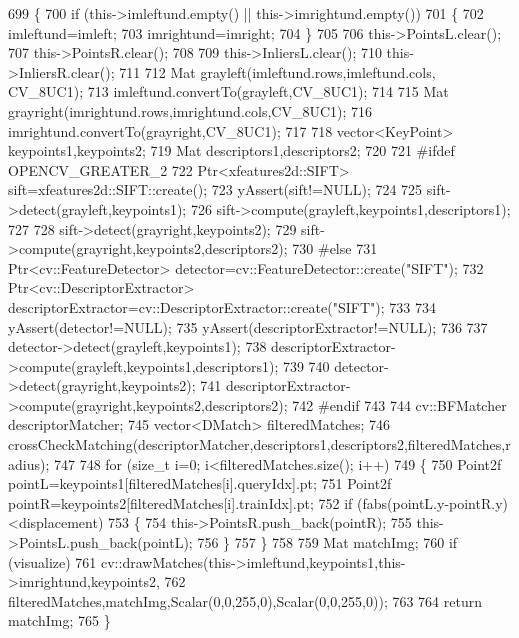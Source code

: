\begin{DoxyCode}
699 \{
700     \textcolor{keywordflow}{if} (this->imleftund.empty() || this->imrightund.empty())
701     \{
702         imleftund=imleft;
703         imrightund=imright;
704     \}
705 
706     this->PointsL.clear();
707     this->PointsR.clear();
708 
709     this->InliersL.clear();
710     this->InliersR.clear();
711 
712     Mat grayleft(imleftund.rows,imleftund.cols, CV\_8UC1);
713     imleftund.convertTo(grayleft,CV\_8UC1);
714 
715     Mat grayright(imrightund.rows,imrightund.cols,CV\_8UC1);
716     imrightund.convertTo(grayright,CV\_8UC1);
717 
718     vector<KeyPoint> keypoints1,keypoints2;
719     Mat descriptors1,descriptors2;
720 
721 \textcolor{preprocessor}{#ifdef OPENCV\_GREATER\_2}
722     Ptr<xfeatures2d::SIFT> sift=xfeatures2d::SIFT::create();
723     yAssert(sift!=NULL);
724 
725     sift->detect(grayleft,keypoints1);
726     sift->compute(grayleft,keypoints1,descriptors1);
727 
728     sift->detect(grayright,keypoints2);
729     sift->compute(grayright,keypoints2,descriptors2);
730 \textcolor{preprocessor}{#else}
731     Ptr<cv::FeatureDetector> detector=cv::FeatureDetector::create(\textcolor{stringliteral}{"SIFT"});
732     Ptr<cv::DescriptorExtractor> descriptorExtractor=cv::DescriptorExtractor::create(\textcolor{stringliteral}{"SIFT"});
733 
734     yAssert(detector!=NULL);
735     yAssert(descriptorExtractor!=NULL);
736 
737     detector->detect(grayleft,keypoints1);
738     descriptorExtractor->compute(grayleft,keypoints1,descriptors1);
739 
740     detector->detect(grayright,keypoints2);
741     descriptorExtractor->compute(grayright,keypoints2,descriptors2);
742 \textcolor{preprocessor}{#endif}
743     
744     cv::BFMatcher descriptorMatcher;
745     vector<DMatch> filteredMatches;
746     crossCheckMatching(descriptorMatcher,descriptors1,descriptors2,filteredMatches,radius);
747 
748     \textcolor{keywordflow}{for} (\textcolor{keywordtype}{size\_t} i=0; i<filteredMatches.size(); i++)
749     \{
750         Point2f pointL=keypoints1[filteredMatches[i].queryIdx].pt;
751         Point2f pointR=keypoints2[filteredMatches[i].trainIdx].pt;
752         \textcolor{keywordflow}{if} (fabs(pointL.y-pointR.y)<displacement)
753         \{
754             this->PointsR.push\_back(pointR);
755             this->PointsL.push\_back(pointL);
756         \}
757     \}
758 
759     Mat matchImg;
760     \textcolor{keywordflow}{if} (visualize)
761         cv::drawMatches(this->imleftund,keypoints1,this->imrightund,keypoints2,
762                 filteredMatches,matchImg,Scalar(0,0,255,0),Scalar(0,0,255,0));
763 
764     \textcolor{keywordflow}{return} matchImg;
765 \}
\end{DoxyCode}
\mbox{\label{classStereoCamera_a3d8fde0cbd4604085b883f22cc606c01}} 
